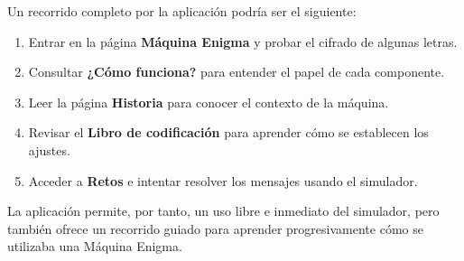 Un recorrido completo por la aplicación podría ser el siguiente:

\begin{enumerate}
	\item Entrar en la página \textbf{Máquina Enigma} y probar el cifrado de algunas letras.
	\item Consultar \textbf{¿Cómo funciona?} para entender el papel de cada componente.
	\item Leer la página \textbf{Historia} para conocer el contexto de la máquina.
	\item Revisar el \textbf{Libro de codificación} para aprender cómo se establecen los ajustes.
	\item Acceder a \textbf{Retos} e intentar resolver los mensajes usando el simulador.
\end{enumerate}

La aplicación permite, por tanto, un uso libre e inmediato del simulador, pero también ofrece un recorrido guiado para aprender progresivamente cómo se utilizaba una Máquina Enigma.
